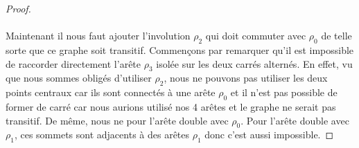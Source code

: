 \begin{proof}
  \begin{figure}[H]
    \begin{center}
      \caption{}
    \end{center}
  \end{figure}

  \paragraph{}
  Maintenant il nous faut ajouter l'involution $\rho_2$ qui doit commuter avec $\rho_0$ de telle sorte que ce graphe soit transitif. Commençons par remarquer qu'il est impossible de raccorder directement l'arête $\rho_3$ isolée sur les deux carrés alternés. En effet, vu que nous sommes obligés d'utiliser $\rho_2$, nous ne pouvons pas utiliser les deux points centraux car ils sont connectés à une arête $\rho_0$ et il n'est pas possible de former de carré car nous aurions utilisé nos 4 arêtes et le graphe ne serait pas transitif. De même, nous ne pour l'arête double avec $\rho_0$. Pour l'arête double avec $\rho_1$, ces sommets sont adjacents à des arêtes $\rho_1$ donc c'est aussi impossible.


\end{proof}
